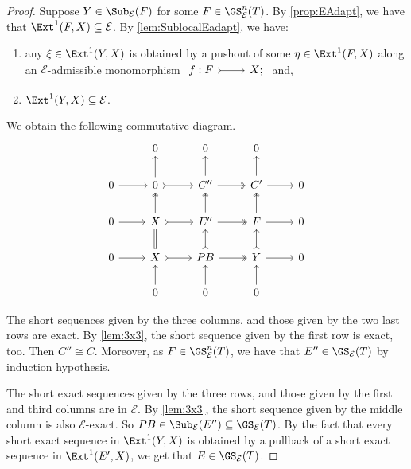 \begin{proof}
Suppose $Y \in \Sub_\mathcal{E}(F)$ for some $F \in \GS^{n}_{\mathcal{E}}(T)$. By \cref{prop:EAdapt}, we have that $\Ext^1(F,X) \subseteq \mathcal{E}$. By \cref{lem:SublocalEadapt}, we have:
\begin{enumerate}[label=$\bullet$, itemsep=1mm]
    \item any $\xi \in \Ext^1(Y,X)$ is obtained by a pushout of some $\eta \in \Ext^1(F,X)$ along an $\mathcal{E}$-admissible monomorphism $\begin{tikzcd}
	 f: F & X;
	\arrow[tail,from=1-1, to=1-2]
   \end{tikzcd}$ and,
    \item $\Ext^1(Y,X) \subseteq \mathcal{E}$.
\end{enumerate}
We obtain the following commutative diagram.
\[\begin{tikzcd}
         & 0 & 0 & 0 &  \\
	0 & 0 & C''  & C' &  0 \\
     0 & X & E'' & F & 0 \\
      0 & X & PB & Y & 0 \\
       & 0 & 0 & 0 & 
	\arrow[from=2-1, to=2-2]
	\arrow[tail, from=2-2, to=2-3]
	\arrow[two heads,from=2-3, to=2-4]
	\arrow[from=2-4, to=2-5]
        \arrow[from=3-1, to=3-2]
	\arrow[tail, from=3-2, to=3-3]
	\arrow[two heads,from=3-3, to=3-4]
	\arrow[from=3-4, to=3-5]
        \arrow[from=4-1, to=4-2]
	\arrow[tail, from=4-2, to=4-3]
	\arrow[two heads,from=4-3, to=4-4]
	\arrow[from=4-4, to=4-5]
        \arrow[from=5-2, to=4-2]
	\arrow[equals, from=4-2, to=3-2]
	\arrow[two heads,from=3-2, to=2-2]
	\arrow[from=2-2, to=1-2]
        \arrow[from=5-3, to=4-3]
	\arrow[tail, from=4-3, to=3-3]
	\arrow[two heads,from=3-3, to=2-3]
	\arrow[from=2-3, to=1-3]
        \arrow[from=5-4, to=4-4]
	\arrow[tail, from=4-4, to=3-4]
	\arrow[two heads,from=3-4, to=2-4]
	\arrow[from=2-4, to=1-4]
\end{tikzcd} \]

The short sequences given by the three columns, and those given by the two last rows are exact. By \cref{lem:3x3}, the short sequence given by the first row is exact, too. Then $C'' \cong C$. Moreover, as $F \in \GS^{n}_{\mathcal{E}}(T)$, we have that $E'' \in \GS_{\mathcal{E}}(T)$ by induction hypothesis.

The short exact sequences given by the three rows, and those given by the first and third columns are in ${\mathcal{E}}$. By \cref{lem:3x3}, the short sequence given by the middle column is also $\mathcal{E}$-exact. So $PB \in \Sub_\mathcal{E}(E'') \subseteq \GS_{\mathcal{E}}(T)$. By the fact that every short exact sequence in $\Ext^1(Y,X)$ is obtained by a pullback of a short exact sequence in $\Ext^1(E',X)$, we get that $E \in \GS_{\mathcal{E}}(T)$.


\end{proof}
